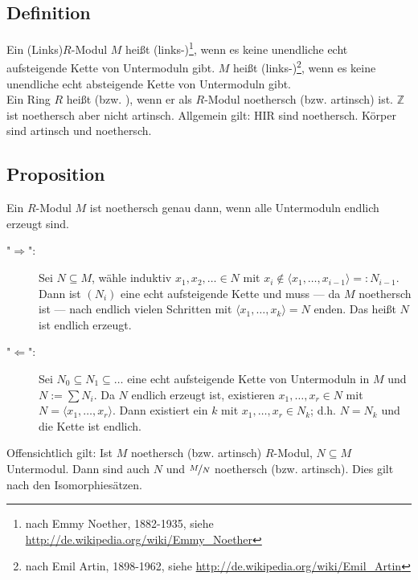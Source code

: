 \subsection[Definition: noethersch und artinsch]{Definition} %
\label{sub:211}
Ein (Links)$R$-Modul $M$ heißt (links-)\footnote{nach Emmy Noether, 1882-1935, siehe \url{http://de.wikipedia.org/wiki/Emmy_Noether}}, 
wenn es keine unendliche echt aufsteigende Kette von Untermoduln gibt.
$M$ heißt (links-)\footnote{nach Emil Artin, 1898-1962, siehe \url{http://de.wikipedia.org/wiki/Emil_Artin}}, 
wenn es keine unendliche echt absteigende Kette von Untermoduln gibt.\\
Ein Ring $R$ heißt  (bzw. ), wenn er als $R$-Modul noethersch (bzw. artinsch) ist.
$\mathds{Z}$ ist noethersch aber nicht artinsch. Allgemein gilt: HIR sind noethersch. Körper sind artinsch und noethersch.

\subsection[Proposition: noethersch $\iff$ alle Untermoduln endlich erzeugt]{Proposition} %
\label{sub:212}
Ein $R$-Modul $M$ ist noethersch genau dann, wenn alle Untermoduln endlich erzeugt sind.
\begin{description}
	\item["$\Rightarrow $":] Sei $N \subseteq M$, wähle induktiv $x_1, x_2, \ldots \in N$ mit $x_i \not\in \langle x_1, \ldots , x_{i-1} \rangle =: N_{i-1}$. Dann ist
	$(N_i)$ eine echt aufsteigende Kette und muss --- da $M$ noethersch ist --- nach endlich vielen Schritten mit $\langle x_1, \ldots , x_k \rangle =N$ enden. 
	Das heißt $N$ ist endlich erzeugt.
	\item["$\Leftarrow$":] Sei $N_0 \subseteq N_1 \subseteq \ldots $ eine echt aufsteigende Kette von Untermoduln in $M$ und $N :=\sum N_i$. 
	Da $N$ endlich erzeugt ist, existieren $x_1,\ldots ,x_r\in N$ mit $N=\langle x_1, \ldots , x_r\rangle$. Dann existiert ein $k$ mit $x_1,\ldots , x_r\in N_k$; 
	d.h. $N=N_k$ und die Kette ist endlich.\bewende
\end{description}
Offensichtlich gilt: Ist $M$ noethersch (bzw. artinsch) $R$-Modul, $N \subseteq M$ Untermodul. Dann sind auch $N$ und $\nicefrac{M}{N}$ noethersch (bzw. artinsch).
Dies gilt nach den Isomorphiesätzen. 

